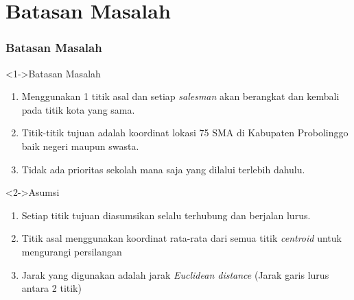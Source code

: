 \section{Batasan Masalah}
\begin{frame}
\frametitle{Batasan Masalah}

\begin{block}<1->{Batasan Masalah}
\begin{enumerate}
\item Menggunakan 1 titik asal dan setiap \textit{salesman} akan berangkat dan kembali pada titik kota yang sama.
\item Titik-titik tujuan adalah koordinat lokasi 75 SMA di Kabupaten Probolinggo baik negeri maupun swasta.
\item Tidak ada prioritas sekolah mana saja yang dilalui terlebih dahulu.
\end{enumerate}
\end{block}
\begin{block}<2->{Asumsi}
\begin{enumerate}
\item Setiap titik tujuan diasumsikan selalu terhubung dan berjalan lurus.
\item Titik asal menggunakan koordinat rata-rata dari semua titik \textit{centroid} untuk mengurangi persilangan
\item Jarak yang digunakan adalah jarak \textit{Euclidean distance} (Jarak garis lurus antara 2 titik)
\end{enumerate}
\end{block}
\end{frame}
